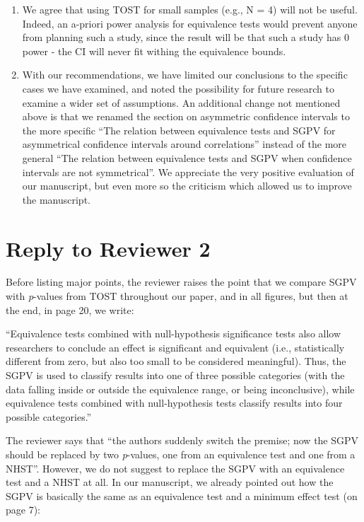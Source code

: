\documentclass[man]{apa6}
\begin{document}
\begin{enumerate}
\item
  We agree that using TOST for small samples (e.g., N = 4) will not be useful. Indeed, an a-priori power analysis for equivalence tests would prevent anyone from planning such a study, since the result will be that such a study has 0 power - the CI will never fit withing the equivalence bounds.
\item
  With our recommendations, we have limited our conclusions to the specific cases we have examined, and noted the possibility for future research to examine a wider set of assumptions. An additional change not mentioned above is that we renamed the section on asymmetric confidence intervals to the more specific \enquote{The relation between equivalence tests and SGPV for asymmetrical confidence intervals around correlations} instead of the more general \enquote{The relation between equivalence tests and SGPV when confidence intervals are not symmetrical}. We appreciate the very positive evaluation of our manuscript, but even more so the criticism which allowed us to improve the manuscript.
\end{enumerate}

\hypertarget{reply-to-reviewer-2}{%
\section{Reply to Reviewer 2}\label{reply-to-reviewer-2}}

Before listing major points, the reviewer raises the point that we compare SGPV with \emph{p}-values from TOST throughout our paper, and in all figures, but then at the end, in page 20, we write:

\enquote{Equivalence tests combined with null-hypothesis significance tests also allow researchers to conclude an effect is significant and equivalent (i.e., statistically different from zero, but also too small to be considered meaningful). Thus, the SGPV is used to classify results into one of three possible categories (with the data falling inside or outside the equivalence range, or being inconclusive), while equivalence tests combined with null-hypothesis tests classify results into four possible categories.}

The reviewer says that \enquote{the authors suddenly switch the premise; now the SGPV should be replaced by two \emph{p}-values, one from an equivalence test and one from a NHST}. However, we do not suggest to replace the SGPV with an equivalence test and a NHST at all. In our manuscript, we already pointed out how the SGPV is basically the same as an equivalence test and a minimum effect test (on page 7):
\end{document}
